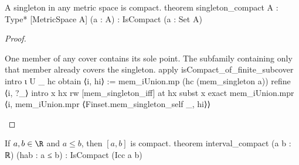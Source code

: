 \begin{lemma} \label{an1:lem:singleton-compact}
  \begin{lean}{A singleton in any metric space is compact.}
    theorem singleton_compact {A : Type*} [MetricSpace A] (a : A) :
        IsCompact ({a} : Set A)
  \end{lean}
\end{lemma}

\begin{proof}
  \begin{lean}{One member of any cover contains its sole point. The subfamily containing only that member already covers the singleton.}
    apply isCompact_of_finite_subcover
    intro ι U _ hc
    obtain ⟨i, hi⟩ := mem_iUnion.mp (hc (mem_singleton a))
    refine ⟨{i}, ?_⟩
    intro x hx
    rw [mem_singleton_iff] at hx
    subst x
    exact mem_iUnion.mpr ⟨i, mem_iUnion.mpr ⟨Finset.mem_singleton_self _, hi⟩⟩
  \end{lean}

\end{proof}

\begin{lemma} \label{an1:lem:interval-compact}
  \begin{lean}{If $a,b\in\R$ and $a\leq b$, then $[a,b]$ is compact.}
    theorem interval_compact (a b : ℝ) (hab : a ≤ b) : IsCompact (Icc a b)
  \end{lean}
\end{lemma}

